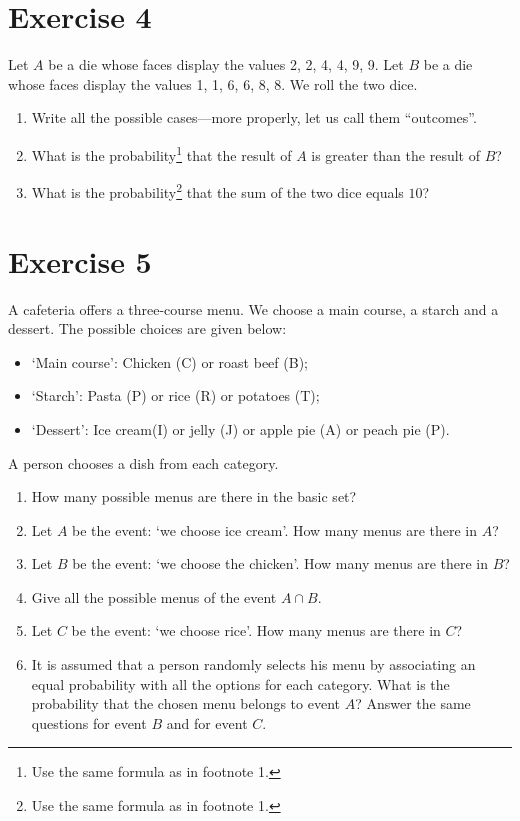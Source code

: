 \documentclass[12pt,thmsa]{article}\usepackage[]{graphicx}\usepackage[]{color}
\begin{document}
\section*{Exercise 4}
Let $A$ be a die whose faces display the values 2, 2, 4, 4, 9, 9.  Let $B$ be a die whose faces display the
values 1, 1, 6, 6, 8, 8. We roll the two dice.

\begin{enumerate}
\item Write all the possible cases---more properly, let us call them ``outcomes''.
\item What is the probability\footnote{Use the same formula as in footnote 1.} that the result of $A$ is greater than the result of $B$?
\item What is the probability\footnote{Use the same formula as in footnote 1.} that the sum of the two dice equals $10$?
\end{enumerate}


\section*{Exercise 5}
A cafeteria offers a three-course menu. We choose a main course, a starch and a
dessert. The possible choices are given below:

\begin{itemize}
\item `Main course': Chicken (C) or roast beef (B);
\item `Starch': Pasta (P) or rice (R) or potatoes (T);
\item `Dessert': Ice cream(I) or jelly (J) or apple pie (A) or peach pie (P).
\end{itemize}

A person chooses a dish from each category.
\begin{enumerate}
\item How many possible menus are there in the basic set?
\item Let $A$ be the event: `we choose ice cream'. How many menus are there in $A$?
\item Let $B$ be the event: `we choose the chicken'. How many menus are there in $B$?
\item Give all the possible menus of the event $A \cap B$.
\item Let $C$ be the event: `we choose rice'. How many menus are there in $C$?
\item It is assumed that a person randomly selects his menu by associating an equal probability with
all the options for each category. What is the probability that the chosen menu belongs to event $A$?
Answer the same questions for event $B$ and for event $C$.

\end{enumerate}
\end{document}
